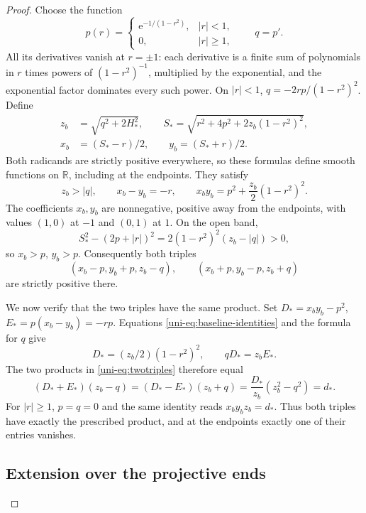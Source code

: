 \begin{proof}
Choose the function
\[
 p(r)=
 \begin{cases}\mathrm{e}^{-1/(1-r^2)},&|r|<1,\\0,&|r|\geq1,
 \end{cases}
 \qquad q=p'.
\]
All its derivatives vanish at $r=\pm1$: each derivative is a finite sum
of polynomials in $r$ times powers of $(1-r^2)^{-1}$, multiplied by the exponential, and the
exponential factor dominates every such power.  On $|r|<1$,
$q=-2rp/(1-r^2)^2$.  Define
\begin{align}
 z_b&=\sqrt{q^2+2H_*^2},\qquad
 S_* =\sqrt{r^2+4p^2+2z_b(1-r^2)^2},\label{uni-eq:baseline1}\\
 x_b&=(S_*-r)/2,\qquad y_b=(S_*+r)/2.\label{uni-eq:baseline2}
\end{align}
Both radicands are strictly positive everywhere, so these formulas define
smooth functions on $\mathbb R$, including at the endpoints.  They satisfy
\begin{equation}\label{uni-eq:baseline-identities}
 z_b>|q|,\qquad x_b-y_b=-r,\qquad
 x_by_b=p^2+\frac{z_b}2(1-r^2)^2.
\end{equation}
The coefficients $x_b,y_b$ are nonnegative, positive away from the
endpoints, with values $(1,0)$ at $-1$ and $(0,1)$ at $1$.
On the open band,
\[
 S_*^2-(2p+|r|)^2=2(1-r^2)^2(z_b-|q|)>0,
\]
so $x_b>p$, $y_b>p$.  Consequently both triples
\begin{equation}\label{uni-eq:twotriples}
 (x_b-p,y_b+p,z_b-q),\qquad (x_b+p,y_b-p,z_b+q)
\end{equation}
are strictly positive there.

We now verify that the two triples have the same product.  Set
$D_*=x_by_b-p^2$, $E_*=p(x_b-y_b)=-rp$.
Equations \eqref{uni-eq:baseline-identities} and the formula for $q$ give
\[
 D_*=(z_b/2)(1-r^2)^2,\qquad qD_*=z_bE_*.
\]
The two products in \eqref{uni-eq:twotriples} therefore equal
\begin{equation}\label{uni-eq:det-cancellation}
 (D_*+E_*)(z_b-q)=(D_*-E_*)(z_b+q)
       =\frac{D_*}{z_b}(z_b^2-q^2)=d_*.
\end{equation}
For $|r|\geq1$, $p=q=0$ and the same identity reads
$x_by_bz_b=d_*$.  Thus both triples have exactly the prescribed
product, and at the endpoints exactly one of their entries vanishes.

\subsection{Extension over the projective ends}
\label{subsec:analytic-global-patch}


\end{proof}
